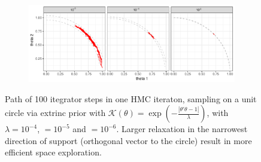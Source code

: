 \documentclass[10pt]{article}
\newcommand{\mc}[1]{\mathcal{#1}}
\DeclareMathOperator{\1}{\mathbbm{1}}
\begin{document}
\begin{figure}[H]
\centering
   \begin{subfigure}[b]{0.8\textwidth}
    \includegraphics[width=1\textwidth]{unit_circle_100steps}
	\end{subfigure}
\caption{Path of 100 itegrator steps in one HMC iteraton, sampling on a unit circle via extrinc prior with $\mc K(\theta)=\exp(-\frac{|\theta'\theta -1|}{\lambda})$, with $\lambda=10^{-4}$, $=10^{-5}$ and $=10^{-6}$. Larger relaxation in the narrowest direction of support (orthogonal vector to the circle) result in more efficient space exploration.}
\label{unit_circle}
\end{figure}
\end{document}
